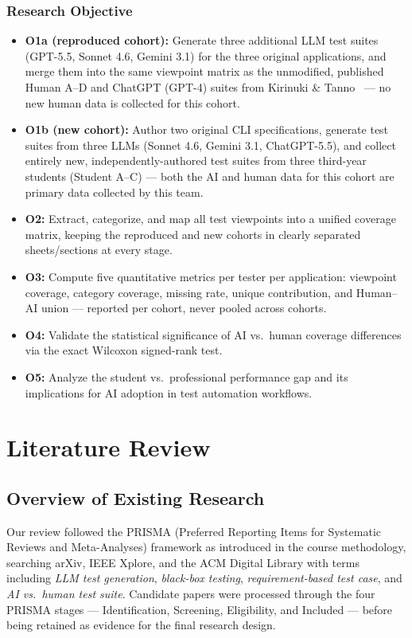 \documentclass[12pt,a4paper]{article}
\begin{document}
\subsubsection*{Research Objective}
\begin{itemize}[leftmargin=1.2cm]
    \item \textbf{O1a (reproduced cohort):} Generate three additional LLM test suites (GPT-5.5, Sonnet 4.6, Gemini 3.1) for the three original applications, and merge them into the same viewpoint matrix as the unmodified, published Human A--D and ChatGPT (GPT-4) suites from Kirinuki \& Tanno~\cite{b1} --- no new human data is collected for this cohort.
    \item \textbf{O1b (new cohort):} Author two original CLI specifications, generate test suites from three LLMs (Sonnet 4.6, Gemini 3.1, ChatGPT-5.5), and collect entirely new, independently-authored test suites from three third-year students (Student A--C) --- both the AI and human data for this cohort are primary data collected by this team.
    \item \textbf{O2:} Extract, categorize, and map all test viewpoints into a unified coverage matrix, keeping the reproduced and new cohorts in clearly separated sheets/sections at every stage.
    \item \textbf{O3:} Compute five quantitative metrics per tester per application: viewpoint coverage, category coverage, missing rate, unique contribution, and Human--AI union --- reported per cohort, never pooled across cohorts.
    \item \textbf{O4:} Validate the statistical significance of AI vs.\ human coverage differences via the exact Wilcoxon signed-rank test.
    \item \textbf{O5:} Analyze the student vs.\ professional performance gap and its implications for AI adoption in test automation workflows.
\end{itemize}

\section{Literature Review}

\subsection*{Overview of Existing Research}
Our review followed the PRISMA (Preferred Reporting Items for Systematic Reviews and Meta-Analyses) framework as introduced in the course methodology, searching arXiv, IEEE Xplore, and the ACM Digital Library with terms including \textit{LLM test generation}, \textit{black-box testing}, \textit{requirement-based test case}, and \textit{AI vs.\ human test suite}. Candidate papers were processed through the four PRISMA stages --- Identification, Screening, Eligibility, and Included --- before being retained as evidence for the final research design.
\end{document}
